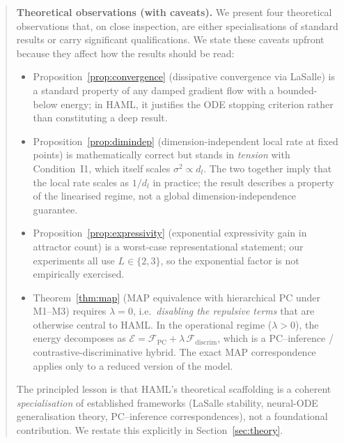 \documentclass[11pt,a4paper]{article}
\begin{document}
\begin{abstract}
\textbf{Theoretical observations (with caveats).}
We present four theoretical observations that, on close inspection, are either
specialisations of standard results or carry significant qualifications. We state these
caveats upfront because they affect how the results should be read:
\begin{itemize}
  \item Proposition~\ref{prop:convergence} (dissipative convergence via LaSalle) is a
        standard property of any damped gradient flow with a bounded-below energy; in
        HAML, it justifies the ODE stopping criterion rather than constituting a deep
        result.
  \item Proposition~\ref{prop:dimindep} (dimension-independent local rate at fixed
        points) is mathematically correct but stands in \emph{tension} with
        Condition~I1, which itself scales $\sigma^2 \propto d_l$. The two together
        imply that the local rate scales as $1/d_l$ in practice; the result describes
        a property of the linearised regime, not a global dimension-independence
        guarantee.
  \item Proposition~\ref{prop:expressivity} (exponential expressivity gain in
        attractor count) is a worst-case representational statement; our experiments
        all use $L \in \{2, 3\}$, so the exponential factor is not empirically
        exercised.
  \item Theorem~\ref{thm:map} (MAP equivalence with hierarchical PC under M1--M3)
        requires $\lambda = 0$, i.e.\ \emph{disabling the repulsive terms} that are
        otherwise central to HAML. In the operational regime ($\lambda > 0$), the
        energy decomposes as $\mathcal{E} = \mathcal{F}_{\mathrm{PC}} + \lambda\,\mathcal{F}_{\mathrm{discrim}}$,
        which is a PC--inference / contrastive-discriminative hybrid. The exact MAP
        correspondence applies only to a reduced version of the model.
\end{itemize}
The principled lesson is that HAML's theoretical scaffolding is a coherent
\emph{specialisation} of established frameworks (LaSalle stability, neural-ODE
generalisation theory, PC--inference correspondences), not a foundational
contribution. We restate this explicitly in Section~\ref{sec:theory}.


\end{abstract}
\end{document}
